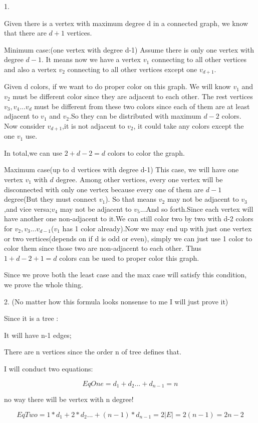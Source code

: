 \documentclass{article}
\begin{document}
1.

Given there is a vertex with maximum degree d in a connected graph, we know that there are $d+1$ vertices. 

Minimum case:(one vertex with degree d-1)
Assume there is only one vertex with degree $d-1$. It means now we have a vertex $v_1$ connecting to all other vertices and also  a vertex $v_2$ connecting to all other vertices except one $v_{d+1}$.

Given d colors, if we want to do proper color on this graph. We will know $v_1$ and $v_2$ must be different color since they are adjacent to each other. The rest vertices $v_3,v_4...v_d$ must be different from these two colors since each of them are at least adjacent to $v_1$ and $v_2$.So they can be distributed with maximum $d-2$ colors. Now consider $v_{d+1}$,it is not adjacent to $v_2$, it could take any colors except the one $v_1$ use. 

In total,we can use $2+d-2 = d$ colors to color the graph.

Maximum case(up to d vertices with degree d-1)
This case, we will have one vertex $v_1$ with $d$ degree. Among other vertices, every one vertex will be disconnected with only one vertex because every one of them are $d-1$ degree(But they must connect $v_1$). So that means $v_2$ may not be adjacent to $v_3$,and vice versa;$v_4$ may not be adjacent to $v_5$...And so forth.Since each vertex will have another one non-adjacent to it.We can still color two by two with d-2 colors for $v_2,v_3...v_{d-1}$($v_1$ has 1 color already).Now we may end up with just one vertex or two vertices(depends on if d is odd or even), simply we can just use 1 color to color them since those two are non-adjacent to each other. Thus $1+d-2+1 = d$ colors can be used to proper color this graph.

Since we prove both the least case and the max case will satisfy this condition, we prove the whole thing.

2.
(No matter how this formula looks nonsense to me I will just prove it)

Since it is a tree : 

It will have n-1 edges;

There are n vertices since the order n of tree defines that.

I will conduct two equations:

\begin{large}

$$EqOne = d_1+d_2...+d_{n-1} = n$$

no way there will be vertex with n degree!

$$EqTwo = 1*d_1+2*d_2...+(n-1)*d_{n-1} =2|E| = 2(n-1)=2n-2$$

\end{large}
\end{document}
